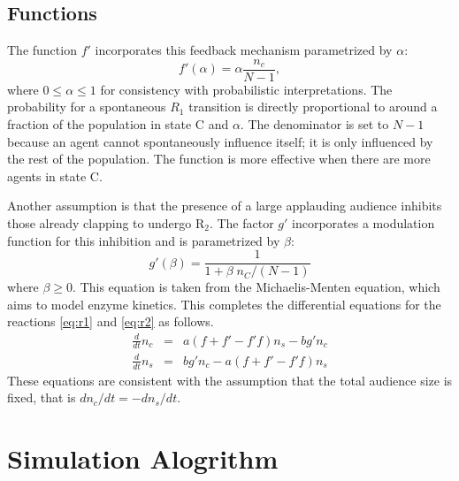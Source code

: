\subsection{Functions}
The function $f'$ incorporates this feedback mechanism parametrized by $\alpha$:
\begin{equation}\label{eq:f'}
  f'(\alpha) = \alpha \frac{n_c}{N-1},
\end{equation}
where $0 \leq \alpha \leq 1$ for consistency with probabilistic interpretations.
The probability for a spontaneous ${R}_{1}$ transition is directly proportional to around a fraction of the population in state C and $\alpha$. The denominator is set to $N-1$ because an agent cannot spontaneously influence itself; it is only influenced by the rest of the population.
The function is more effective when there are more agents in state C.

Another assumption is that the presence of a large applauding audience 
inhibits those already clapping to undergo $\mathrm{R}_{2}$.
The factor $g'$ incorporates a modulation function for this inhibition and is parametrized by $\beta$: 
\begin{equation}\label{eq:g'}
  g'(\beta) = \frac{1}{1 + \beta\;n_C /(N-1)}
\end{equation}
where $\beta \geq 0$. This equation is taken from the Michaelis-Menten equation, which aims to model enzyme kinetics\cite{michaelisconstant}.
This completes the differential equations for the reactions \eqref{eq:r1} and \eqref{eq:r2} as follows.
\begin{eqnarray}
\frac{d}{dt}n_{c} &=& a (f+f'-f'f) n_{s} - b g' n_{c}\label{eq:diff1} \\
\frac{d}{dt}n_{s} &=& b g' n_{c} - a (f+f'-f'f) n_{s}\label{eq:diff2}
\end{eqnarray}
These equations are consistent with the assumption that the total audience size is fixed, that is $dn_{c}/dt = -dn_{s}/dt$.

\section{Simulation Alogrithm}


